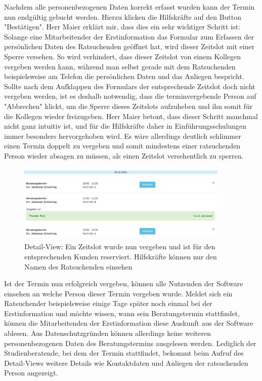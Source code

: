 \documentclass[12pt]{article}
\newcommand{\ipName}{Herr Maier }
\begin{document}
Nachdem alle personenbezogenen Daten korrekt erfasst wurden kann der Termin nun
endgültig gebucht werden. Hierzu klicken die Hilfskräfte auf den Button
"Bestätigen". \ipName erklärt mir, dass dies ein sehr wichtiger Schritt ist:
Solange eine Mitarbeitender der Erstinformation das Formular zum Erfassen der
persönlichen Daten des Ratsuchenden geöffnet hat, wird dieser Zeitslot mit
einer Sperre versehen. So wird verhindert, dass dieser Zeitslot von einem
Kollegen vergeben werden kann, während man selbst gerade mit dem Ratsuchenden
beispielsweise am Telefon die persönlichen Daten und das Anliegen bespricht.
Sollte nach dem Aufklappen des Formulars der entsprechende Zeitslot doch nicht
vergeben werden, ist es deshalb notwendig, dass die terminvergebende Person auf
"Abbrechen" klickt, um die Sperre dieses Zeitslots aufzuheben und ihn somit für
die Kollegen wieder freizugeben. \ipName betont, dass dieser Schritt manchmal
nicht ganz intuitiv ist, und für die Hilfskräfte daher in Einführungsschulungen
immer besonders hervorgehoben wird. Es wäre allerdings deutlich schlimmer einen
Termin doppelt zu vergeben und somit mindestens einer ratsuchenden Person
wieder absagen zu müssen, als einen Zeitslot versehentlich zu sperren.

\begin{figure}[h]
    \caption{Detail-View: Ein Zeitslot wurde nun vergeben und ist für den entsprechenden Kunden reserviert. Hilfskräfte können nur den Namen des Ratsuchenden einsehen}
    \centering
    \includegraphics[width=0.9\textwidth]{screen_old_assigned_hiwi.png}
\end{figure}

Ist der Termin nun erfolgreich vergeben, können alle Nutzenden der Software
einsehen an welche Person dieser Termin vergeben wurde. Meldet sich ein
Ratsuchender beispielsweise einige Tage später noch einmal bei der
Erstinformation und möchte wissen, wann sein Beratungstermin stattfindet,
können die Mitarbeitenden der Erstinformation diese Auskunft aus der Software
ablesen. Aus Datenschutzgründen können allerdings keine weiteren
personenbezogenen Daten des Beratungstermins ausgelesen werden. Lediglich der
Studienberatende, bei dem der Termin stattfindet, bekommt beim Aufruf des
Detail-Views weitere Details wie Kontaktdaten und Anliegen der ratsuchenden
Person angezeigt.
\end{document}
